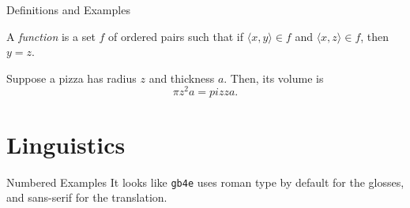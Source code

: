 \documentclass{beamer}
\theoremstyle{definition}
\theoremstyle{example}
\begin{document}
\begin{frame}{Definitions and Examples}

	\begin{definition}
		A \textit{function} is a set $f$ of ordered pairs such that if $\langle x, y \rangle \in f$ and $\langle x, z \rangle \in f$, then $y = z$.
	\end{definition}

	\begin{example}
		Suppose a pizza has radius $z$ and thickness $a$. Then, its volume is
		\[
		\pi z^2 a = pizza.
		\]
	\end{example}

\end{frame}



\section{Linguistics}

\begin{frame}{Numbered Examples}
	It looks like \texttt{gb4e} uses roman type by default for the glosses, and sans-serif for the translation.
	\begin{exe}
	\end{exe}
\end{frame}
\end{document}
